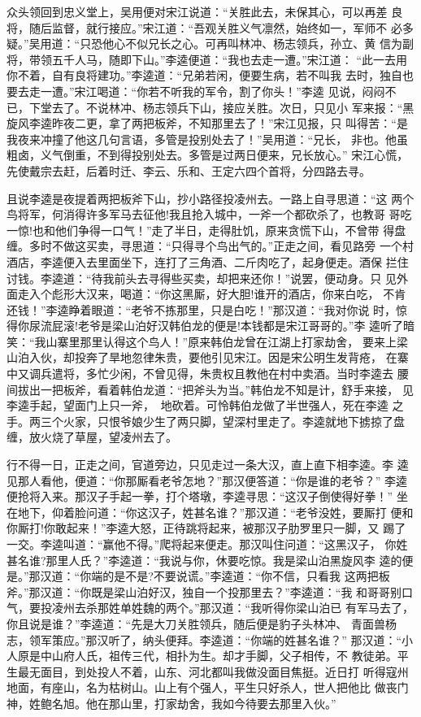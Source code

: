众头领回到忠义堂上，吴用便对宋江说道：“关胜此去，未保其心，可以再差
良将，随后监督，就行接应。”宋江道：“吾观关胜义气凛然，始终如一，军师不
必多疑。”吴用道：“只恐他心不似兄长之心。可再叫林冲、杨志领兵，孙立、黄
信为副将，带领五千人马，随即下山。”李逵便道：“我也去走一遭。”宋江道：
“此一去用你不着，自有良将建功。”李逵道：“兄弟若闲，便要生病，若不叫我
去时，独自也要去走一遭。”宋江喝道：“你若不听我的军令，割了你头！”李逵
见说，闷闷不已，下堂去了。不说林冲、杨志领兵下山，接应关胜。次日，只见小
军来报：“黑旋风李逵昨夜二更，拿了两把板斧，不知那里去了！”宋江见报，只
叫得苦：“是我夜来冲撞了他这几句言语，多管是投别处去了！”吴用道：“兄长，
非也。他虽粗卤，义气倒重，不到得投别处去。多管是过两日便来，兄长放心。”
宋江心慌，先使戴宗去赶，后着时迁、李云、乐和、王定六四个首将，分四路去寻。

且说李逵是夜提着两把板斧下山，抄小路径投凌州去。一路上自寻思道：“这
两个鸟将军，何消得许多军马去征他!我且抢入城中，一斧一个都砍杀了，也教哥
哥吃一惊!也和他们争得一口气！”走了半日，走得肚饥，原来贪慌下山，不曾带
得盘缠。多时不做这买卖，寻思道：“只得寻个鸟出气的。”正走之间，看见路旁
一个村酒店，李逵便入去里面坐下，连打了三角酒、二斤肉吃了，起身便走。酒保
拦住讨钱。李逵道：“待我前头去寻得些买卖，却把来还你！”说罢，便动身。只
见外面走入个彪形大汉来，喝道：“你这黑厮，好大胆!谁开的酒店，你来白吃，
不肯还钱！”李逵睁着眼道：“老爷不拣那里，只是白吃！”那汉道：“我对你说
时，惊得你尿流屁滚!老爷是梁山泊好汉韩伯龙的便是!本钱都是宋江哥哥的。”李
逵听了暗笑：“我山寨里那里认得这个鸟人！”原来韩伯龙曾在江湖上打家劫舍，
要来上梁山泊入伙，却投奔了旱地忽律朱贵，要他引见宋江。因是宋公明生发背疮，
在寨中又调兵遣将，多忙少闲，不曾见得，朱贵权且教他在村中卖酒。当时李逵去
腰间拔出一把板斧，看着韩伯龙道：“把斧头为当。”韩伯龙不知是计，舒手来接，
见李逵手起，望面门上只一斧，地砍着。可怜韩伯龙做了半世强人，死在李逵
之手。两三个火家，只恨爷娘少生了两只脚，望深村里走了。李逵就地下掳掠了盘
缠，放火烧了草屋，望凌州去了。

行不得一日，正走之间，官道旁边，只见走过一条大汉，直上直下相李逵。李
逵见那人看他，便道：“你那厮看老爷怎地？”那汉便答道：“你是谁的老爷？”
李逵便抢将入来。那汉子手起一拳，打个塔墩，李逵寻思：“这汉子倒使得好拳！”
坐在地下，仰着脸问道：“你这汉子，姓甚名谁？”那汉道：“老爷没姓，要厮打
便和你厮打!你敢起来！”李逵大怒，正待跳将起来，被那汉子肋罗里只一脚，又
踢了一交。李逵叫道：“赢他不得。”爬将起来便走。那汉叫住问道：“这黑汉子，
你姓甚名谁?那里人氏？”李逵道：“我说与你，休要吃惊。我是梁山泊黑旋风李
逵的便是。”那汉道：“你端的是不是?不要说谎。”李逵道：“你不信，只看我
这两把板斧。”那汉道：“你既是梁山泊好汉，独自一个投那里去？”李逵道：“我
和哥哥别口气，要投凌州去杀那姓单姓魏的两个。”那汉道：“我听得你梁山泊已
有军马去了，你且说是谁？”李逵道：“先是大刀关胜领兵，随后便是豹子头林冲、
青面兽杨志，领军策应。”那汉听了，纳头便拜。李逵道：“你端的姓甚名谁？”
那汉道：“小人原是中山府人氏，祖传三代，相扑为生。却才手脚，父子相传，不
教徒弟。平生最无面目，到处投人不着，山东、河北都叫我做没面目焦挺。近日打
听得寇州地面，有座山，名为枯树山。山上有个强人，平生只好杀人，世人把他比
做丧门神，姓鲍名旭。他在那山里，打家劫舍，我如今待要去那里入伙。”

